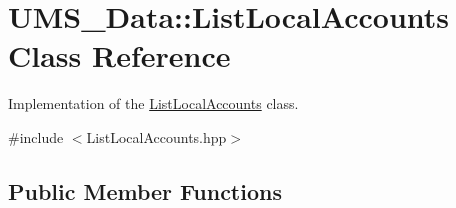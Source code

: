 \hypertarget{classUMS__Data_1_1ListLocalAccounts}{
\section{UMS\_\-Data::ListLocalAccounts Class Reference}
\label{classUMS__Data_1_1ListLocalAccounts}
}


Implementation of the \hyperlink{classUMS__Data_1_1ListLocalAccounts}{ListLocalAccounts} class.  




{\ttfamily \#include $<$ListLocalAccounts.hpp$>$}

\subsection*{Public Member Functions}
